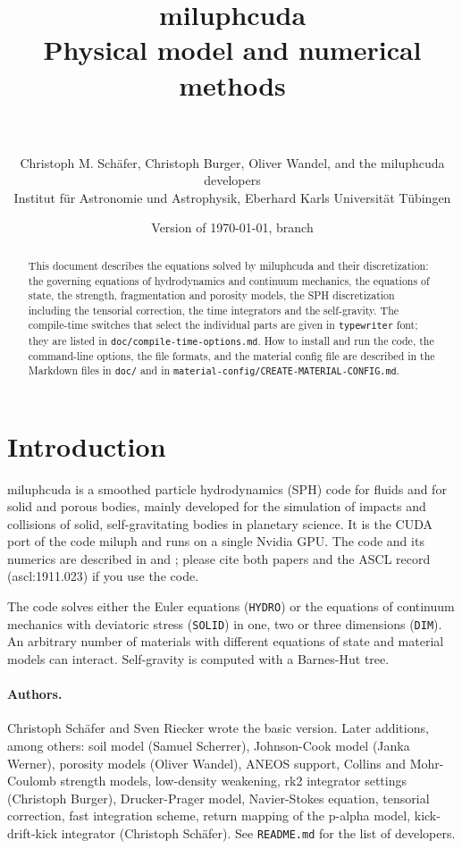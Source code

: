 \documentclass[10pt,fleqn,twoside]{article}
\title{{\Large\textbf{miluphcuda}}\\[0.2cm]
{\large Physical model and numerical methods}\\[0.2cm]
\crule[unirot]{0.5em}{0.5em}~~~\crule[blue]{0.5em}{0.5em}~~~\crule[unigold]{0.5em}{0.5em}}
\author{Christoph M. Sch\"afer, Christoph Burger, Oliver Wandel, and the miluphcuda developers\\
Institut f\"ur Astronomie und Astrophysik, Eberhard Karls Universit\"at T\"ubingen}
\date{Version of \today, branch \code{cms\_devel}}
\newcommand{\code}[1]{\texttt{#1}}
\newcommand{\sw}[1]{\texttt{#1}}
\begin{document}
\sloppy
\renewcommand{\_}{\textunderscore\allowbreak}

\maketitle
\thispagestyle{empty}

\begin{abstract}
\noindent This document describes the equations solved by miluphcuda and their discretization: the governing
equations of hydrodynamics and continuum mechanics, the equations of state, the strength, fragmentation and porosity
models, the SPH discretization including the tensorial correction, the time integrators and the self-gravity. The
compile-time switches that select the individual parts are given in \code{typewriter} font; they are listed in
\code{doc/compile-time-options.md}. How to install and run the code, the command-line options, the file formats, and
the material config file are described in the Markdown files in \code{doc/} and in
\code{material-config/CREATE-MATERIAL-CONFIG.md}.
\end{abstract}

\tableofcontents
\newpage


\section{Introduction}

miluphcuda is a smoothed particle hydrodynamics (SPH) code for fluids and for solid and porous bodies, mainly developed
for the simulation of impacts and collisions of solid, self-gravitating bodies in planetary science. It is the CUDA
port of the code miluph and runs on a single Nvidia GPU. The code and its numerics are described in
\citet{schaefer2016} and \citet{schaefer2020}; please cite both papers and the ASCL record (ascl:1911.023) if you use
the code.

The code solves either the Euler equations (\sw{HYDRO}) or the equations of continuum mechanics with deviatoric
stress (\sw{SOLID}) in one, two or three dimensions (\sw{DIM}). An arbitrary number of materials with different
equations of state and material models can interact. Self-gravity is computed with a Barnes-Hut tree.

\paragraph{Authors.} Christoph Sch\"afer and Sven Riecker wrote the basic version. Later additions, among others:
soil model (Samuel Scherrer), Johnson-Cook model (Janka Werner), porosity models (Oliver Wandel), ANEOS support,
Collins and Mohr-Coulomb strength models, low-density weakening, rk2 integrator settings (Christoph Burger),
Drucker-Prager model, Navier-Stokes equation, tensorial correction, fast integration scheme, return mapping of the
p-alpha model, kick-drift-kick integrator (Christoph Sch\"afer). See \code{README.md} for the list of developers.
\end{document}
